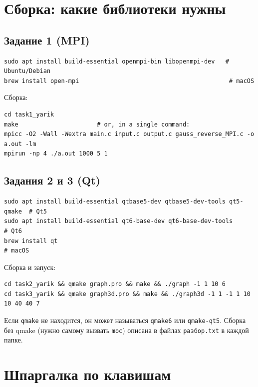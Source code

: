 \documentclass[11pt,a4paper]{report}
\begin{document}
\appendix

\chapter{Сборка: какие библиотеки нужны}

\section{Задание 1 (MPI)}
\begin{lstlisting}[style=c]
sudo apt install build-essential openmpi-bin libopenmpi-dev   # Ubuntu/Debian
brew install open-mpi                                          # macOS
\end{lstlisting}
Сборка:
\begin{lstlisting}[style=c]
cd task1_yarik
make                      # or, in a single command:
mpicc -O2 -Wall -Wextra main.c input.c output.c gauss_reverse_MPI.c -o a.out -lm
mpirun -np 4 ./a.out 1000 5 1
\end{lstlisting}

\section{Задания 2 и 3 (Qt)}
\begin{lstlisting}[style=c]
sudo apt install build-essential qtbase5-dev qtbase5-dev-tools qt5-qmake  # Qt5
sudo apt install build-essential qt6-base-dev qt6-base-dev-tools          # Qt6
brew install qt                                                           # macOS
\end{lstlisting}
Сборка и запуск:
\begin{lstlisting}[style=c]
cd task2_yarik && qmake graph.pro && make && ./graph -1 1 10 6
cd task3_yarik && qmake graph3d.pro && make && ./graph3d -1 1 -1 1 10 10 40 40 7
\end{lstlisting}
Если \texttt{qmake} не находится, он может называться \texttt{qmake6} или
\texttt{qmake-qt5}. Сборка без qmake (нужно самому вызвать \texttt{moc})
описана в файлах \texttt{разбор.txt} в каждой папке.

\chapter{Шпаргалка по клавишам}
\end{document}
